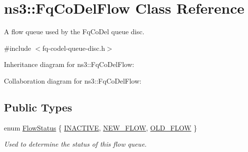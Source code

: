 \hypertarget{classns3_1_1FqCoDelFlow}{}\section{ns3\+:\+:Fq\+Co\+Del\+Flow Class Reference}
\label{classns3_1_1FqCoDelFlow}


A flow queue used by the Fq\+Co\+Del queue disc.  




{\ttfamily \#include $<$fq-\/codel-\/queue-\/disc.\+h$>$}



Inheritance diagram for ns3\+:\+:Fq\+Co\+Del\+Flow\+:


Collaboration diagram for ns3\+:\+:Fq\+Co\+Del\+Flow\+:
\subsection*{Public Types}
\begin{DoxyCompactItemize}
\item 
enum \hyperlink{classns3_1_1FqCoDelFlow_afbdbeaa5fc8659ada26a5d7f0e277b39}{Flow\+Status} \{ \hyperlink{classns3_1_1FqCoDelFlow_afbdbeaa5fc8659ada26a5d7f0e277b39a78fb27260b3ab5ae4be536a7c1db2648}{I\+N\+A\+C\+T\+I\+VE}, 
\hyperlink{classns3_1_1FqCoDelFlow_afbdbeaa5fc8659ada26a5d7f0e277b39a463e696f2052afd8374d11abed72a1b7}{N\+E\+W\+\_\+\+F\+L\+OW}, 
\hyperlink{classns3_1_1FqCoDelFlow_afbdbeaa5fc8659ada26a5d7f0e277b39a16cf978971383163caae2cc85e8c7df6}{O\+L\+D\+\_\+\+F\+L\+OW}
 \}\begin{DoxyCompactList}\small\item\em Used to determine the status of this flow queue. \end{DoxyCompactList}
\end{DoxyCompactItemize}
